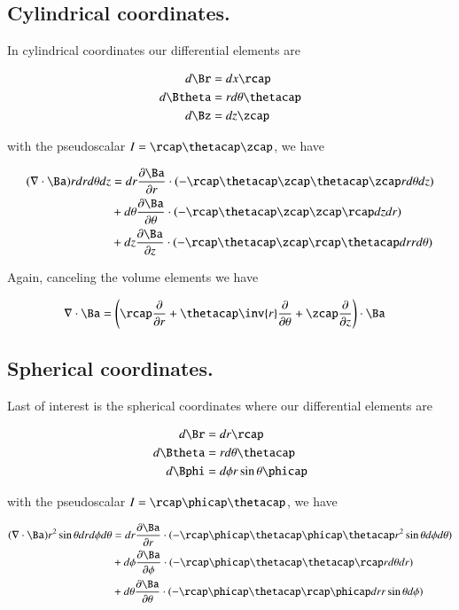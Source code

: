 \subsection{Cylindrical coordinates.}

In cylindrical coordinates our differential elements are

\begin{align*}
d\Br &= dx \rcap \\
d\Btheta &= r d\theta \thetacap \\
d\Bz &= dz \zcap
\end{align*}

with the pseudoscalar $I = \rcap \thetacap \zcap$, we have

\begin{align*}
(\grad \cdot \Ba ) r dr d\theta dz &=
 dr \PD{r}{\Ba} \cdot (-\rcap \thetacap \zcap \thetacap \zcap r d\theta dz )  \\
&+d\theta \PD{\theta}{\Ba} \cdot (-\rcap \thetacap \zcap \zcap \rcap dz dr )  \\
&+dz \PD{z}{\Ba} \cdot (-\rcap \thetacap \zcap \rcap \thetacap dr r d\theta )
\end{align*}

Again, canceling the volume elements we have

\begin{align}\label{eqn:cylindricalGradDot}
\grad \cdot \Ba &=
\left(\rcap \PD{r}{}
+\thetacap \inv{r} \PD{\theta}{}
+\zcap \PD{z}{} \right) \cdot \Ba
\end{align}

\subsection{Spherical coordinates.}

Last of interest is the spherical coordinates where our differential elements are

\begin{align*}
d\Br &= dr \rcap \\
d\Btheta &= r d\theta \thetacap \\
d\Bphi &= d\phi r \sin\theta \phicap
\end{align*}

with the pseudoscalar $I = \rcap \phicap \thetacap$, we have

\begin{align*}
(\grad \cdot \Ba ) r^2 \sin\theta dr d\phi d\theta &=
 dr \PD{r}{\Ba} \cdot (-\rcap \phicap \thetacap \phicap \thetacap r^2 \sin\theta d\phi d\theta )  \\
&+d\phi \PD{\phi}{\Ba} \cdot (-\rcap \phicap \thetacap \thetacap \rcap r d\theta dr )  \\
&+d\theta \PD{\theta}{\Ba} \cdot (-\rcap \phicap \thetacap \rcap \phicap dr r \sin\theta d\phi )
\end{align*}

